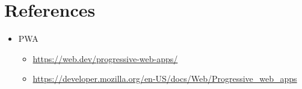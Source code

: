 \section{References}
\begin{itemize}
    \item PWA
    \begin{itemize}
        \item \url{https://web.dev/progressive-web-apps/}
        \item \url{https://developer.mozilla.org/en-US/docs/Web/Progressive_web_apps}
    \end{itemize}
\end{itemize}